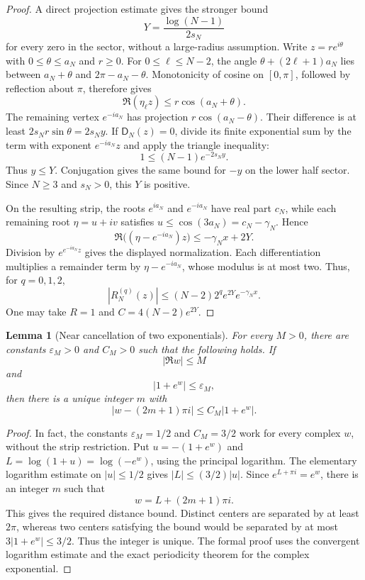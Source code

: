 \documentclass[11pt]{article}
\newtheorem{lemma}[lemma]{Lemma}
\theoremstyle{definition}
\theoremstyle{remark}
\newcommand{\Dfun}{\mathsf D}
\begin{document}
\begin{proof}
A direct projection estimate gives the stronger bound
\[
Y=\frac{\log(N-1)}{2s_N}
\]
for every zero in the sector, without a large-radius assumption.
Write $z=re^{i\theta}$ with $0\leq\theta\leq a_N$ and $r\geq0$.
For $0\leq\ell\leq N-2$, the angle
$\theta+(2\ell+1)a_N$ lies between $a_N+\theta$ and
$2\pi-a_N-\theta$. Monotonicity of cosine on $[0,\pi]$, followed by
reflection about $\pi$, therefore gives
\[
\Re(\eta_\ell z)\leq r\cos(a_N+\theta).
\]
The remaining vertex $e^{-ia_N}$ has projection $r\cos(a_N-\theta)$.
Their difference is at least $2s_Nr\sin\theta=2s_Ny$.
If $\Dfun_N(z)=0$, divide its finite exponential sum by the term
with exponent $e^{-ia_N}z$ and apply the triangle inequality:
\[
1\leq(N-1)e^{-2s_Ny}.
\]
Thus $y\leq Y$. Conjugation gives the same bound for $-y$ on the lower
half sector. Since $N\geq3$ and $s_N>0$, this $Y$ is positive.

On the resulting strip, the roots $e^{ia_N}$ and $e^{-ia_N}$ have
real part $c_N$, while each remaining root $\eta=u+iv$ satisfies
$u\leq\cos(3a_N)=c_N-\gamma_N$. Hence
\[
\Re\bigl((\eta-e^{-ia_N})z\bigr)
\leq-\gamma_Nx+2Y.
\]
Division by $e^{e^{-ia_N}z}$ gives the displayed normalization.
Each differentiation multiplies a remainder term by
$\eta-e^{-ia_N}$, whose modulus is at most two. Thus, for $q=0,1,2$,
\[
|R_N^{(q)}(z)|\leq(N-2)2^qe^{2Y}e^{-\gamma_Nx}.
\]
One may take $R=1$ and $C=4(N-2)e^{2Y}$.
\end{proof}

\begin{lemma}[Near cancellation of two exponentials]\label{lem:near_cancellation}
For every $M>0$, there are constants $\varepsilon_M>0$ and $C_M>0$ such that the following holds.  If
\[
|\Re w|\leq M
\]
and
\[
|1+e^w|\leq\varepsilon_M,
\]
then there is a unique integer $m$ with
\[
|w-(2m+1)\pi i|
\leq
C_M|1+e^w|.
\]
\end{lemma}

\begin{proof}
In fact, the constants $\varepsilon_M=1/2$ and $C_M=3/2$ work
for every complex $w$, without the strip restriction. Put
$u=-(1+e^w)$ and $L=\log(1+u)=\log(-e^w)$, using the principal
logarithm. The elementary logarithm estimate on $|u|\leq1/2$ gives
$|L|\leq(3/2)|u|$. Since $e^{L+\pi i}=e^w$, there is an integer
$m$ such that
\[
w=L+(2m+1)\pi i.
\]
This gives the required distance bound. Distinct centers are separated
by at least $2\pi$, whereas two centers satisfying the bound would
be separated by at most $3|1+e^w|\leq3/2$. Thus the integer is unique.
The formal proof uses the convergent logarithm estimate and the exact
periodicity theorem for the complex exponential.
\end{proof}
\end{document}
